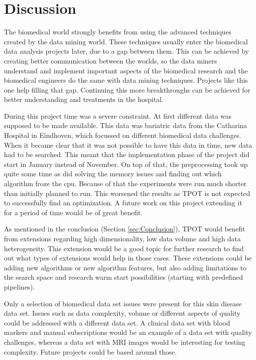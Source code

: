 \documentclass[10pt,a4paper]{article}
\begin{document}
	\section{Discussion}
	\label{sec:Discussion}
	
	The biomedical world strongly benefits from using the advanced techniques created by the data mining world. These techniques usually enter the biomedical data analysis projects later, due to a gap between them. This can be achieved by creating better communication between the worlds, so the data miners understand and implement important aspects of the biomedical research and the biomedical engineers do the same with data mining techniques. Projects like this one help filling that gap. Continuing this more breakthroughs can be achieved for better understanding and treatments in the hospital.
	
	During this project time was a severe constraint. At first different data was supposed to be made available. This data was bariatric data from the Catharina Hospital in Eindhoven, which focussed on different biomedical data challenges. \cite{Deneer2017Thesis} When it became clear that it was not possible to have this data in time, new data had to be searched. This meant that the implementation phase of the project did start in January instead of November. On top of that, the preprocessing took up quite some time as did solving the memory issues and finding out which algorithm froze the cpu. Because of that the experiments were run much shorter than initially planned to run. This worsened the results as TPOT is not expected to successfully find an optimization. A future work on this project extending it for a period of time would be of great benefit.
	
	As mentioned in the conclusion (Section \ref{sec:Conclusion}), TPOT would benefit from extensions regarding high dimensionality, low data volume and high data heterogeneity. This extension would be a good topic for further research to find out what types of extensions would help in those cases. These extensions could be adding new algorithms or new algorithm features, but also adding limitations to the search space and research warm start possibilities (starting with predefined pipelines).
	
	Only a selection of biomedical data set issues were present for this skin disease data set. Issues such as data complexity, volume or different aspects of quality could be addressed with a different data set. A clinical data set with blood markers and manual subscriptions would be an example of a data set with quality challenges, whereas a data set with MRI images would be interesting for testing complexity. Future projects could be based around those.
	
\end{document}
